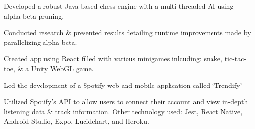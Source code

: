 \documentclass[]{deedy-resume-openfont}
\begin{document}
\begin{tightemize}
\item Developed a robust Java-based chess engine with a multi-threaded AI using alpha-beta-pruning. 
\item Conducted research \& presented results detailing runtime improvements made by parallelizing alpha-beta.
\end{tightemize}
\sectionsep

\begin{tightemize}
\item Created app using React filled with various minigames inlcuding: snake, tic-tac-toe, \& a Unity WebGL game.
\end{tightemize}
\sectionsep

\begin{tightemize}
\item Led the development of a Spotify web and mobile application called ‘Trendify’
\item Utilized Spotify’s API to allow users to connect their account and view in-depth listening data \& track information. Other technology used: Jest, React Native, Android Studio, Expo, Lucidchart, and Heroku.
\end{tightemize}





\sectionsep\
\hfill
\vfill\eject
\end{document}
